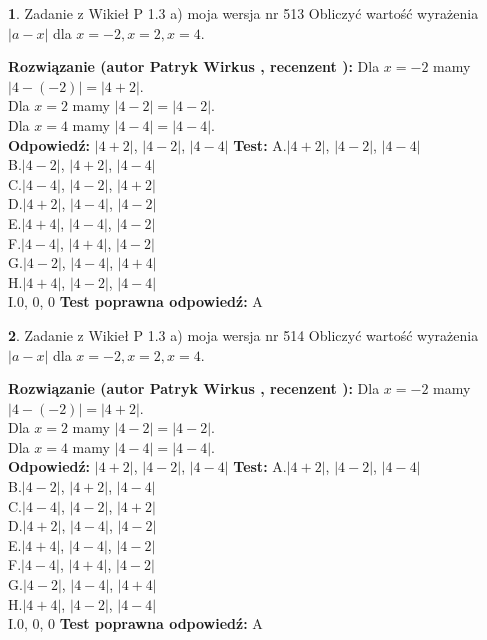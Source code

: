 \documentclass[12pt, a4paper]{article}
\theoremstyle{definition} %
\newtheorem{zad}{}
\newcommand{\zadStart}[1]{\begin{zad}#1\newline}
\newcommand{\zadStop}{\end{zad}}
\newcommand{\rozwStart}[2]{\noindent \textbf{Rozwiązanie (autor #1 , recenzent #2): }\newline}
\newcommand{\rozwStop}{\newline}
\newcommand{\odpStart}{\noindent \textbf{Odpowiedź:}\newline}
\newcommand{\odpStop}{\newline}
\newcommand{\testStart}{\noindent \textbf{Test:}\newline}
\newcommand{\testStop}{\newline}
\newcommand{\kluczStart}{\noindent \textbf{Test poprawna odpowiedź:}\newline}
\newcommand{\kluczStop}{\newline}
\begin{document}
\zadStart{Zadanie z Wikieł P 1.3 a) moja wersja nr 513}
Obliczyć wartość wyrażenia $|a - x|$ dla $x=-2,x=2,x=4$.
\zadStop
\rozwStart{Patryk Wirkus}{}
Dla $x = -2$ mamy $|4 - (-2)| = |4 + 2|$.\\
Dla $x = 2$ mamy $|4 - 2| = |4 - 2|$.\\
Dla $x = 4$ mamy $|4 - 4| = |4 - 4|$.\\
\rozwStop
\odpStart
$|4 + 2|$, $|4 - 2|$, $|4 - 4|$
\odpStop
\testStart
A.$|4 + 2|$, $|4 - 2|$, $|4 - 4|$\\
B.$|4 - 2|$, $|4 + 2|$, $|4 - 4|$\\
C.$|4 - 4|$, $|4 - 2|$, $|4 + 2|$\\
D.$|4 + 2|$, $|4 - 4|$, $|4 - 2|$\\
E.$|4 + 4|$, $|4 - 4|$, $|4 - 2|$\\
F.$|4 - 4|$, $|4 + 4|$, $|4 - 2|$\\
G.$|4 - 2|$, $|4 - 4|$, $|4 + 4|$\\
H.$|4 + 4|$, $|4 - 2|$, $|4 - 4|$\\
I.$0$, $0$, $0$
\testStop
\kluczStart
A
\kluczStop



\zadStart{Zadanie z Wikieł P 1.3 a) moja wersja nr 514}
Obliczyć wartość wyrażenia $|a - x|$ dla $x=-2,x=2,x=4$.
\zadStop
\rozwStart{Patryk Wirkus}{}
Dla $x = -2$ mamy $|4 - (-2)| = |4 + 2|$.\\
Dla $x = 2$ mamy $|4 - 2| = |4 - 2|$.\\
Dla $x = 4$ mamy $|4 - 4| = |4 - 4|$.\\
\rozwStop
\odpStart
$|4 + 2|$, $|4 - 2|$, $|4 - 4|$
\odpStop
\testStart
A.$|4 + 2|$, $|4 - 2|$, $|4 - 4|$\\
B.$|4 - 2|$, $|4 + 2|$, $|4 - 4|$\\
C.$|4 - 4|$, $|4 - 2|$, $|4 + 2|$\\
D.$|4 + 2|$, $|4 - 4|$, $|4 - 2|$\\
E.$|4 + 4|$, $|4 - 4|$, $|4 - 2|$\\
F.$|4 - 4|$, $|4 + 4|$, $|4 - 2|$\\
G.$|4 - 2|$, $|4 - 4|$, $|4 + 4|$\\
H.$|4 + 4|$, $|4 - 2|$, $|4 - 4|$\\
I.$0$, $0$, $0$
\testStop
\kluczStart
A
\kluczStop
\end{document}
